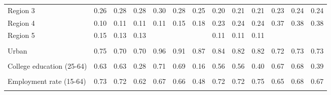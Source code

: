 \begin{tabular}{l*{12}{c}}
Region 3 & 0.26 & 0.28 & 0.28 & 0.30 & 0.28 & 0.25 & 0.20 & 0.21 & 0.21 & 0.23 & 0.24 & 0.24 \\
Region 4 & 0.10 & 0.11 & 0.11 & 0.11 & 0.15 & 0.18 & 0.23 & 0.24 & 0.24 & 0.37 & 0.38 & 0.38 \\
Region 5 & 0.15 & 0.13 & 0.13 & & & & 0.11 & 0.11 & 0.11 & & & \\
\\
Urban & 0.75 & 0.70 & 0.70 & 0.96 & 0.91 & 0.87 & 0.84 & 0.82 & 0.82 & 0.72 & 0.73 & 0.73 \\
\\
College education (25-64) & 0.63 & 0.63 & 0.28 & 0.71 & 0.69 & 0.16 & 0.56 & 0.56 & 0.40 & 0.67 & 0.68 & 0.39 \\
\\
Employment rate (15-64) & 0.73 & 0.72 & 0.62 & 0.67 & 0.66 & 0.48 & 0.72 & 0.72 & 0.75 & 0.65 & 0.68 & 0.67 \\
\\
\bottomrule
\end{tabular}